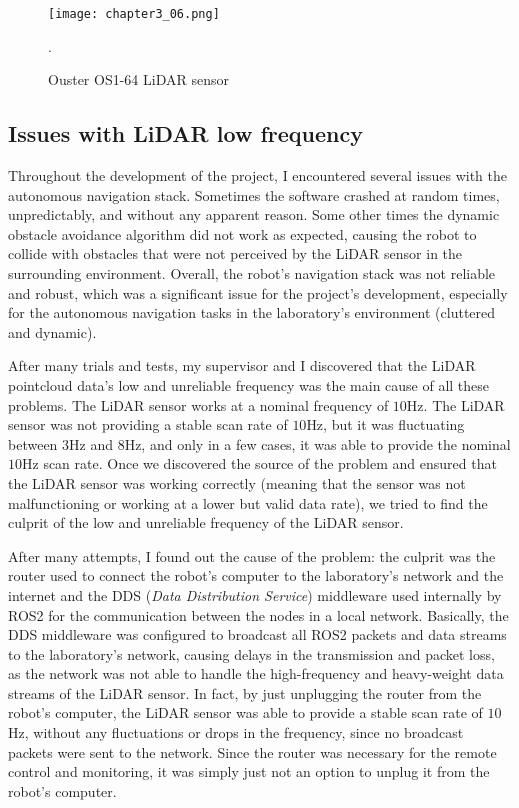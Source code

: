 \begin{figure}[ht]
    \centering
    \texttt{[image: chapter3\_06.png]}
    \captionsetup{width=1\linewidth}
    \caption{Ouster OS1-64 LiDAR sensor}.
    \label{fig:c3_img06}
\end{figure}

\subsection*{Issues with LiDAR low frequency}

Throughout the development of the project, I encountered several issues with the autonomous navigation stack.
Sometimes the software crashed at random times, unpredictably, and without any apparent reason.
Some other times the dynamic obstacle avoidance algorithm did not work as expected, causing the robot to collide
with obstacles that were not perceived by the LiDAR sensor in the surrounding environment.
Overall, the robot's navigation stack was not reliable and robust, which was a significant issue for the project's development,
especially for the autonomous navigation tasks in the laboratory's environment (cluttered and dynamic).

After many trials and tests, my supervisor and I discovered that the LiDAR pointcloud data's low and unreliable frequency
was the main cause of all these problems. The LiDAR sensor works at a nominal frequency of $10$Hz. 
The LiDAR sensor was not providing a stable scan rate of $10$Hz, but it was fluctuating between $3$Hz and $8$Hz, 
and only in a few cases, it was able to provide the nominal $10$Hz scan rate.
Once we discovered the source of the problem and ensured that the LiDAR sensor was working correctly
(meaning that the sensor was not malfunctioning or working at a lower but valid data rate), 
we tried to find the culprit of the low and unreliable frequency of the LiDAR sensor.

After many attempts, I found out the cause of the problem: the culprit was the router used to connect the robot's computer
to the laboratory's network and the internet and the DDS (\textit{Data Distribution Service}) middleware used 
internally by ROS2 for the communication between the nodes in a local network. Basically, the DDS middleware
was configured to broadcast all ROS2 packets and data streams to the laboratory's network, causing delays in the transmission
and packet loss, as the network was not able to handle the high-frequency and heavy-weight data streams of the LiDAR sensor.
In fact, by just unplugging the router from the robot's computer, the LiDAR sensor was able to provide a stable scan rate
of $10$Hz, without any fluctuations or drops in the frequency, since no broadcast packets were sent to the network.
Since the router was necessary for the remote control and monitoring, it was simply just not an option
to unplug it from the robot's computer.

